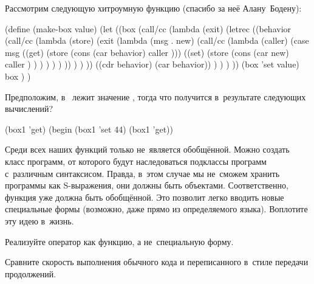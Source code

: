\begin{exercise}\label{escape/ex:crazy-cc}
Рассмотрим следующую хитроумную функцию (спасибо за неё Алану~Бодену):

\begin{code:lisp}
(define (make-box value)
  (let ((box
         (call/cc
          (lambda (exit)
            (letrec
             ((behavior
               (call/cc
                (lambda (store)
                  (exit (lambda (msg . new)
                          (call/cc
                           (lambda (caller)
                             (case msg
                               ((get) (store (cons (car behavior)
                                                   caller )))
                               ((set)
                                (store
                                 (cons (car new)
                                       caller ) ) ) ) ) ) )) ) ) ))
             ((cdr behavior) (car behavior)) ) ) ) ))
    (box 'set value)
    box ) )
\end{code:lisp}

Предположим, в~ лежит значение , тогда что получится
в~результате следующих вычислений?

\begin{code:lisp}
(box1 'get)
(begin (box1 'set 44) (box1 'get))
\end{code:lisp}
\end{exercise}


\begin{exercise}\label{escape/ex:generic-evaluate}
Среди всех наших функций только  не~является обобщённой. Можно
создать класс программ, от которого будут наследоваться подклассы программ
с~различным синтаксисом. Правда, в~этом случае мы не~сможем хранить программы
как S-выражения, они должны быть объектами. Соответственно, функция
 уже должна быть обобщённой. Это позволит легко вводить новые
специальные формы (возможно, даже прямо из определяемого языка). Воплотите эту
идею в~жизнь.
\end{exercise}


\begin{exercise}\label{escape/ex:throw}
Реализуйте оператор  как функцию, а не~специальную форму.
\end{exercise}


\begin{exercise}\label{escape/ex:cps-speed}
Сравните скорость выполнения обычного кода и переписанного в~стиле передачи
продолжений.
\end{exercise}


